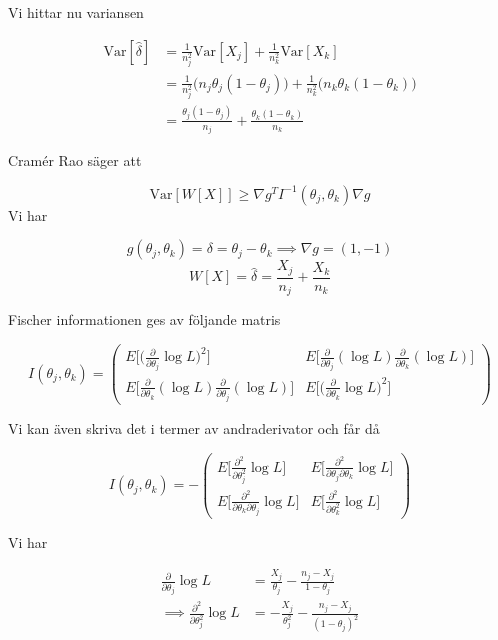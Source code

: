 \documentclass{article}
\newcommand{\var}{\text{Var}}
\begin{document}
Vi hittar nu variansen

\[
\begin{aligned}
    \var [\hat \delta ]&=\frac{1}{n_j^2}\var[X_j]+\frac{1}{n_k^2}\var[X_k]\\
    &=\frac{1}{n_j^2}\big(n_j\theta_j(1-\theta_j)\big)+\frac{1}{n_k^2}\big(n_k\theta_k(1-\theta_k)\big)\\
    &=\frac{\theta_j(1-\theta_j)}{n_j}+\frac{\theta_k(1-\theta_k)}{n_k}
\end{aligned}
\]


Cramér Rao säger att

\[
\var[W[X]]\geq \nabla g^TI^{-1}(\theta_j,\theta_k)\nabla g
\]
Vi har

\[
g(\theta_j,\theta_k)=\delta =\theta_j-\theta_k\implies \nabla g=(1,-1)
\]
\[
W[X]=\hat \delta =\frac{X_j}{n_j}+\frac{X_k}{n_k}
\]

Fischer informationen ges av följande matris

\[
I(\theta_j,\theta_k)=\begin{pmatrix}
    E\Bigg[\Big(\frac{\partial }{\partial \theta_j}\log L\Big)^2\Bigg]& E\Bigg[\frac{\partial }{\partial \theta_j}(\log L)\frac{\partial }{\partial \theta_k}(\log L)\Bigg]\\ E\Bigg[\frac{\partial }{\partial \theta_k}(\log L)\frac{\partial }{\partial \theta_j}(\log L)\Bigg] & E\Bigg[\Big(\frac{\partial }{\partial \theta_k}\log L\Big)^2\Bigg]
\end{pmatrix}
\]

Vi kan även skriva det i termer av andraderivator och får då

\[I(\theta_j,\theta_k)=-
\begin{pmatrix}
    E\Bigg[\frac{\partial^2}{\partial \theta_j^2}\log L\Bigg]&E\Bigg[\frac{\partial^2}{\partial \theta_j\partial \theta_k}\log L\Bigg] \\
    E\Bigg[\frac{\partial^2}{\partial \theta_k\partial \theta_j}\log L\Bigg]&E\Bigg[\frac{\partial^2}{\partial \theta_k^2}\log L\Bigg]
\end{pmatrix}
\]

Vi har

\[
\begin{aligned}
     \frac{\partial }{\partial \theta_j}\log L&=\frac{X_j}{\theta_j}-\frac{n_j-X_j}{1-\theta_j}\\
     \implies \frac{\partial ^2}{\partial \theta_j^2}\log L &=-\frac{X_j}{\theta_j^2}-\frac{n_j-X_j}{(1-\theta_j)^2}
\end{aligned}
\]
\end{document}
